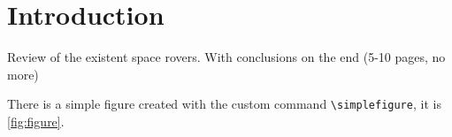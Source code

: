\section{Introduction}

Review of the existent space rovers. With conclusions on the end (5-10 pages,
no more)

There is a simple figure created with the custom command
\texttt{\textbackslash simplefigure}, it is \cref{fig:figure}.

